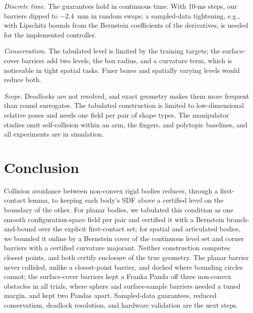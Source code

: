 \documentclass[journal]{IEEEtran}
\theoremstyle{definition}
\begin{document}
\emph{Discrete time.} The guarantees hold in continuous time. With 10-ms steps, our barriers dipped
to $-2.4$~mm in random swaps; a sampled-data tightening, e.g., with Lipschitz bounds from the
Bernstein coefficients of the derivatives, is needed for the implemented controller.

\emph{Conservatism.} The tabulated level is limited by the training targets; the surface-cover
barriers add two levels, the box radius, and a curvature term, which is noticeable in tight spatial
tasks. Finer boxes and spatially varying levels would reduce both.

\emph{Scope.} Deadlocks are not resolved, and exact geometry makes them more frequent than round
surrogates. The tabulated construction is limited to low-dimensional relative poses and needs one
field per pair of shape types. The manipulator studies omit self-collision within an arm, the
fingers, and polytopic baselines, and all experiments are in simulation.

\section{Conclusion}\label{sec:concl}
Collision avoidance between non-convex rigid bodies reduces, through a first-contact lemma, to
keeping each body's SDF above a certified level on the boundary of the other. For planar bodies,
we tabulated this condition as one smooth configuration-space field per pair and certified it with a
Bernstein branch-and-bound over the explicit first-contact set; for spatial and articulated bodies,
we bounded it online by a Bernstein cover of the continuous level set and corner barriers with a
certified curvature majorant. Neither construction computes closest points, and both certify
enclosure of the true geometry. The planar barrier never collided, unlike a closest-point barrier,
and docked where bounding circles cannot; the surface-cover barriers kept a Franka Panda off three
non-convex obstacles in all trials, where sphere and surface-sample barriers needed a tuned margin,
and kept two Pandas apart. Sampled-data guarantees, reduced conservatism, deadlock
resolution, and hardware validation are the next steps.



\end{document}

